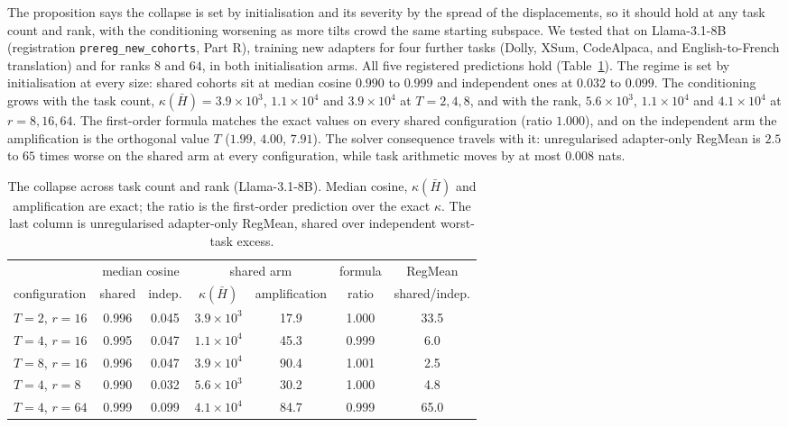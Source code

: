 The proposition says the collapse is set by initialisation and its severity
by the spread of the displacements, so it should hold at any task count and
rank, with the conditioning worsening as more tilts crowd the same starting
subspace. We tested that on Llama-3.1-8B (registration
\texttt{prereg\_new\_cohorts}, Part R), training new adapters for four further
tasks (Dolly, XSum, CodeAlpaca, and English-to-French translation) and for
ranks $8$ and $64$, in both initialisation arms. All five registered
predictions hold (Table~\ref{tab:tr-sweep}). The regime is set by
initialisation at every size: shared cohorts sit at median cosine $0.990$ to
$0.999$ and independent ones at $0.032$ to $0.099$. The conditioning grows with
the task count, $\kappa(\bar H) = 3.9\times10^{3}$, $1.1\times10^{4}$ and
$3.9\times10^{4}$ at $T = 2, 4, 8$, and with the rank, $5.6\times10^{3}$,
$1.1\times10^{4}$ and $4.1\times10^{4}$ at $r = 8, 16, 64$. The first-order
formula matches the exact values on every shared configuration (ratio
$1.000$), and on the independent arm the amplification is the orthogonal value
$T$ ($1.99$, $4.00$, $7.91$). The solver consequence travels with it:
unregularised adapter-only RegMean is $2.5$ to $65$ times worse on the shared
arm at every configuration, while task arithmetic moves by at most $0.008$
nats.

\begin{table}[t]
\centering
\small
\caption{The collapse across task count and rank (Llama-3.1-8B). Median cosine,
$\kappa(\bar H)$ and amplification are exact; the ratio is the first-order
prediction over the exact $\kappa$. The last column is unregularised
adapter-only RegMean, shared over independent worst-task excess.}
\label{tab:tr-sweep}
\begin{tabular}{lcccccc}
\toprule
 & \multicolumn{2}{c}{median cosine} & \multicolumn{2}{c}{shared arm} &
 formula & RegMean \\
configuration & shared & indep. & $\kappa(\bar H)$ & amplification & ratio & shared/indep. \\
\midrule
$T=2$, $r=16$  & 0.996 & 0.045 & $3.9\times10^{3}$ & 17.9 & 1.000 & 33.5 \\
$T=4$, $r=16$  & 0.995 & 0.047 & $1.1\times10^{4}$ & 45.3 & 0.999 & 6.0 \\
$T=8$, $r=16$  & 0.996 & 0.047 & $3.9\times10^{4}$ & 90.4 & 1.001 & 2.5 \\
$T=4$, $r=8$   & 0.990 & 0.032 & $5.6\times10^{3}$ & 30.2 & 1.000 & 4.8 \\
$T=4$, $r=64$  & 0.999 & 0.099 & $4.1\times10^{4}$ & 84.7 & 0.999 & 65.0 \\
\bottomrule
\end{tabular}
\end{table}

